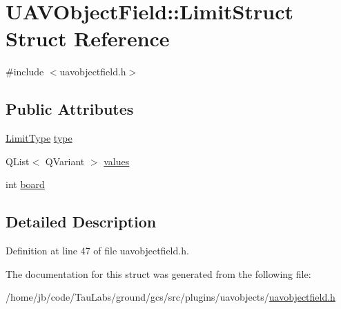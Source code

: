 \hypertarget{struct_u_a_v_object_field_1_1_limit_struct}{\section{\-U\-A\-V\-Object\-Field\-:\-:\-Limit\-Struct \-Struct \-Reference}
\label{struct_u_a_v_object_field_1_1_limit_struct}
}


{\ttfamily \#include $<$uavobjectfield.\-h$>$}

\subsection*{\-Public \-Attributes}
\begin{DoxyCompactItemize}
\item 
\hyperlink{group___u_a_v_objects_plugin_gab90b52ee80a0622d280a4c2fc8e601cb}{\-Limit\-Type} \hyperlink{group___u_a_v_objects_plugin_ga7f346cc2754bc63a0a0ae587b183b3ff}{type}
\item 
\-Q\-List$<$ \-Q\-Variant $>$ \hyperlink{group___u_a_v_objects_plugin_ga27188ffa94eb6c560765dd56b0471561}{values}
\item 
int \hyperlink{group___u_a_v_objects_plugin_gae5d5e0653c652c0e50c62526f8fbee72}{board}
\end{DoxyCompactItemize}


\subsection{\-Detailed \-Description}


\-Definition at line 47 of file uavobjectfield.\-h.



\-The documentation for this struct was generated from the following file\-:\begin{DoxyCompactItemize}
\item 
/home/jb/code/\-Tau\-Labs/ground/gcs/src/plugins/uavobjects/\hyperlink{uavobjectfield_8h}{uavobjectfield.\-h}\end{DoxyCompactItemize}
